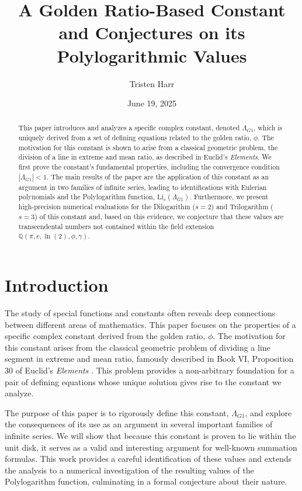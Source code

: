 \documentclass{amsart}
\theoremstyle{plain}
\theoremstyle{definition}
\theoremstyle{remark}
\newcommand{\LambdaG}{\Lambda_{G1}}
\begin{document}
\title[A Golden Ratio Constant and its Polylogarithmic Values]{A Golden Ratio-Based Constant and Conjectures on its Polylogarithmic Values}
\author{Tristen Harr}
\date{June 19, 2025}

\begin{abstract}
This paper introduces and analyzes a specific complex constant, denoted $\LambdaG$, which is uniquely derived from a set of defining equations related to the golden ratio, $\phi$. The motivation for this constant is shown to arise from a classical geometric problem, the division of a line in extreme and mean ratio, as described in Euclid's \textit{Elements}. We first prove the constant's fundamental properties, including the convergence condition $|\LambdaG| < 1$. The main results of the paper are the application of this constant as an argument in two families of infinite series, leading to identifications with Eulerian polynomials and the Polylogarithm function, $\mathrm{Li}_s(\LambdaG)$. Furthermore, we present high-precision numerical evaluations for the Dilogarithm ($s=2$) and Trilogarithm ($s=3$) of this constant and, based on this evidence, we conjecture that these values are transcendental numbers not contained within the field extension $\mathbb{Q}(\pi, e, \ln(2), \phi, \gamma)$.
\end{abstract}

\maketitle

\section{Introduction}
The study of special functions and constants often reveals deep connections between different areas of mathematics. This paper focuses on the properties of a specific complex constant derived from the golden ratio, $\phi$. The motivation for this constant arises from the classical geometric problem of dividing a line segment in extreme and mean ratio, famously described in Book VI, Proposition 30 of Euclid's \textit{Elements} \cite{Euclid}. This problem provides a non-arbitrary foundation for a pair of defining equations whose unique solution gives rise to the constant we analyze.

The purpose of this paper is to rigorously define this constant, $\LambdaG$, and explore the consequences of its use as an argument in several important families of infinite series. We will show that because this constant is proven to lie within the unit disk, it serves as a valid and interesting argument for well-known summation formulas. This work provides a careful identification of these values and extends the analysis to a numerical investigation of the resulting values of the Polylogarithm function, culminating in a formal conjecture about their nature.
\end{document}

